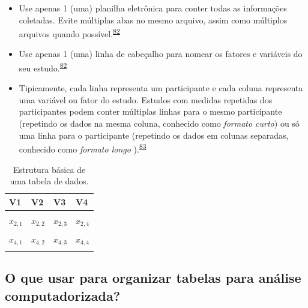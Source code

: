 \documentclass[
  a4paper,
]{book}
\begin{document}
\begin{itemize}
\item
  Use apenas 1 (uma) planilha eletrônica para conter todas as informações coletadas. Evite múltiplas abas no mesmo arquivo, assim como múltiplos arquivos quando possível.\textsuperscript{\protect\hyperlink{ref-broman2018}{82}}
\item
  Use apenas 1 (uma) linha de cabeçalho para nomear os fatores e variáveis do seu estudo.\textsuperscript{\protect\hyperlink{ref-broman2018}{82}}
\item
  Tipicamente, cada linha representa um participante e cada coluna representa uma variável ou fator do estudo. Estudos com medidas repetidas dos participantes podem conter múltiplas linhas para o mesmo participante (repetindo os dados na mesma coluna, conhecido como \emph{formato curto}) ou só uma linha para o participante (repetindo os dados em colunas separadas, conhecido como \emph{formato longo} ).\textsuperscript{\protect\hyperlink{ref-Juluru2015}{83}}
\end{itemize}

\begin{table}

\caption{\label{tab:tabela-0}Estrutura básica de uma tabela de dados.}
\centering
\begin{tabu} to 
\toprule
\textbf{V1} & \textbf{V2} & \textbf{V3} & \textbf{V4}\\
\midrule
{} &  &  & \\
$x_{2,1}$ & $x_{2,2}$ & $x_{2,3}$ & $x_{2,4}$\\
 &  &  & \\
$x_{4,1}$ & $x_{4,2}$ & $x_{4,3}$ & $x_{4,4}$\\
 &  &  & \\
\bottomrule
\end{tabu}
\end{table}

\hypertarget{o-que-usar-para-organizar-tabelas-para-anuxe1lise-computadorizada}{%
\subsection{O que usar para organizar tabelas para análise computadorizada?}\label{o-que-usar-para-organizar-tabelas-para-anuxe1lise-computadorizada}}
\end{document}
